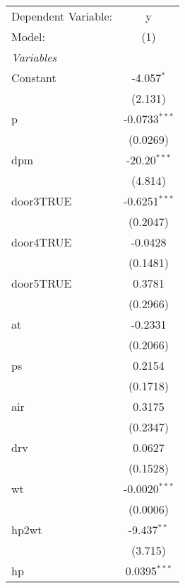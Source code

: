 
\begingroup
\centering
\begin{tabular}{lc}
   \tabularnewline \midrule \midrule
   Dependent Variable:            & y\\  
   Model:                         & (1)\\  
   \midrule
   \emph{Variables}\\
   Constant                       & -4.057$^{*}$\\   
                                  & (2.131)\\   
   p                              & -0.0733$^{***}$\\   
                                  & (0.0269)\\   
   dpm                            & -20.20$^{***}$\\   
                                  & (4.814)\\   
   door3TRUE                      & -0.6251$^{***}$\\   
                                  & (0.2047)\\   
   door4TRUE                      & -0.0428\\   
                                  & (0.1481)\\   
   door5TRUE                      & 0.3781\\   
                                  & (0.2966)\\   
   at                             & -0.2331\\   
                                  & (0.2066)\\   
   ps                             & 0.2154\\   
                                  & (0.1718)\\   
   air                            & 0.3175\\   
                                  & (0.2347)\\   
   drv                            & 0.0627\\   
                                  & (0.1528)\\   
   wt                             & -0.0020$^{***}$\\   
                                  & (0.0006)\\   
   hp2wt                          & -9.437$^{**}$\\   
                                  & (3.715)\\   
   hp                             & 0.0395$^{***}$\\   

\end{tabular}
